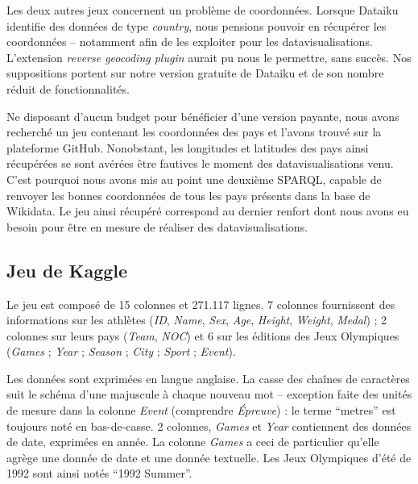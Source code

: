 \documentclass[hidelinks, 12pt]{report}
\begin{document}
Les deux autres jeux concernent un problème de coordonnées. Lorsque Dataiku identifie des données de type \textit{country}, nous pensions pouvoir en récupérer les coordonnées -- notamment afin de les exploiter pour les datavisualisations. L'extension \textit{reverse geocoding plugin} aurait pu nous le permettre, sans succès. Nos suppositions portent sur notre version gratuite de Dataiku et de son nombre réduit de fonctionnalités.

Ne disposant d'aucun budget pour bénéficier d'une version payante, nous avons recherché un jeu contenant les coordonnées des pays et l'avons trouvé sur la plateforme GitHub\autocite{github}. Nonobstant, les longitudes et latitudes des pays ainsi récupérées se sont avérées être fautives le moment des datavisualisations venu. C'est pourquoi nous avons mis au point une deuxième SPARQL, capable de renvoyer les bonnes coordonnées de tous les pays présents dans la base de Wikidata\autocite{wikiquerycoor}. Le jeu ainsi récupéré correspond au dernier renfort dont nous avons eu besoin pour être en mesure de réaliser des datavisualisations.





%





\subsection{Jeu de Kaggle}

Le jeu est composé de 15 colonnes et 271.117 lignes. 7 colonnes fournissent des informations sur les athlètes (\textit{ID}, \textit{Name}, \textit{Sex}, \textit{Age}, \textit{Height}, \textit{Weight}, \textit{Medal}) ; 2 colonnes sur leurs pays (\textit{Team}, \textit{NOC}) et 6 sur les éditions des Jeux Olympiques (\textit{Games} ; \textit{Year} ; \textit{Season} ; \textit{City} ; \textit{Sport} ; \textit{Event}).

Les données sont exprimées en langue anglaise. La casse des chaînes de caractères suit le schéma d'une majuscule à chaque nouveau mot -- exception faite des unités de mesure dans la colonne \textit{Event} (comprendre \textit{Épreuve}) : le terme \enquote{metres} est toujours noté en bas-de-casse. 2 colonnes, \textit{Games} et \textit{Year} contiennent des données de date, exprimées en année. La colonne \textit{Games} a ceci de particulier qu'elle agrège une donnée de date et une donnée textuelle. Les Jeux Olympiques d'été de 1992 sont ainsi notés \enquote{1992 Summer}.
\end{document}

